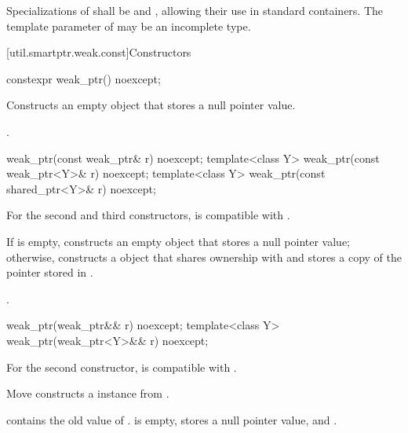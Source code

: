 \pnum
Specializations of  shall be  and
, allowing their use in standard
containers.  The template parameter  of  may be an
incomplete type.

[util.smartptr.weak.const]{Constructors}

%
\begin{itemdecl}
constexpr weak_ptr() noexcept;
\end{itemdecl}

\begin{itemdescr}
\pnum
\effects
Constructs an empty  object that stores a null pointer value.

\pnum
\ensures
{}.
\end{itemdescr}

%
\begin{itemdecl}
weak_ptr(const weak_ptr& r) noexcept;
template<class Y> weak_ptr(const weak_ptr<Y>& r) noexcept;
template<class Y> weak_ptr(const shared_ptr<Y>& r) noexcept;
\end{itemdecl}

\begin{itemdescr}
\pnum
\constraints
For the second and third constructors,  is compatible with .

\pnum
\effects
If  is empty, constructs
an empty  object that stores a null pointer value;
otherwise, constructs
a  object that shares ownership
with  and stores a copy of the pointer stored in .

\pnum
\ensures
{}.
\end{itemdescr}

%
\begin{itemdecl}
weak_ptr(weak_ptr&& r) noexcept;
template<class Y> weak_ptr(weak_ptr<Y>&& r) noexcept;
\end{itemdecl}

\begin{itemdescr}
\pnum
\constraints
For the second constructor,  is compatible with .

\pnum
\effects
Move constructs a  instance from .

\pnum
\ensures
{} contains the old value of .
 is empty, stores a null pointer value, and .
\end{itemdescr}

